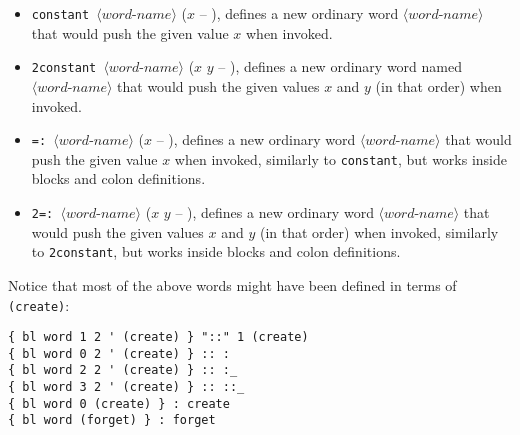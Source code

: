 \documentclass[12pt,oneside]{article}
\begin{document}
\begin{itemize}
\item {\tt constant $\langle\textit{word-name}\rangle$} ($x$ -- ), defines a new ordinary word $\langle\textit{word-name}\rangle$ that would push the given value $x$ when invoked.
\item {\tt 2constant $\langle\textit{word-name}\rangle$} ($x$ $y$ -- ), defines a new ordinary word named $\langle\textit{word-name}\rangle$ that would push the given values $x$ and $y$ (in that order) when invoked.
\item {\tt =: $\langle\textit{word-name}\rangle$} ($x$ -- ), defines a new ordinary word $\langle\textit{word-name}\rangle$ that would push the given value $x$ when invoked, similarly to {\tt constant}, but works inside blocks and colon definitions.
\item {\tt 2=: $\langle\textit{word-name}\rangle$} ($x$ $y$ -- ), defines a new ordinary word $\langle\textit{word-name}\rangle$ that would push the given values $x$ and $y$ (in that order) when invoked, similarly to {\tt 2constant}, but works inside blocks and colon definitions.
\end{itemize}
Notice that most of the above words might have been defined in terms of {\tt (create)}:
\begin{verbatim}
{ bl word 1 2 ' (create) } "::" 1 (create)
{ bl word 0 2 ' (create) } :: :
{ bl word 2 2 ' (create) } :: :_
{ bl word 3 2 ' (create) } :: ::_
{ bl word 0 (create) } : create
{ bl word (forget) } : forget
\end{verbatim}
\end{document}
